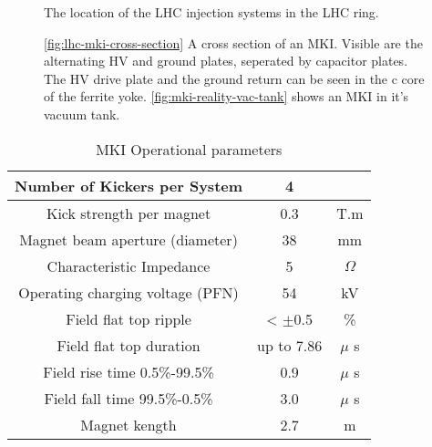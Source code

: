 \begin{figure}
\label{fig:lhc-injection-systems}
\caption{The location of the LHC injection systems in the LHC ring.}
\end{figure}


\begin{figure}
\subfigure[]{
\label{fig:lhc-mki-cross-section}
}
\subfigure[]{
\label{fig:mki-reality-vac-tank}
}
\caption{\ref{fig:lhc-mki-cross-section} A cross section of an MKI. Visible are the alternating HV and ground plates, seperated by capacitor plates. The HV drive plate and the ground return can be seen in the c core of the ferrite yoke. \ref{fig:mki-reality-vac-tank} shows an MKI in it's vacuum tank.}
\end{figure}

\begin{table}
\caption{MKI Operational parameters}

\begin{center}
\begin{tabular}{c | c | c}
Number of Kickers per System & 4 & \\ \hline
Kick strength per magnet & 0.3 & T.m \\ \hline
Magnet beam aperture (diameter) & 38 & mm \\ \hline
Characteristic Impedance & 5 & $\Omega$ \\ \hline
Operating charging voltage (PFN) & 54 & kV \\ \hline
Field flat top ripple & < $\pm$0.5 & \% \\ \hline
Field flat top duration & up to 7.86 & $\mu$ s \\ \hline
Field rise time 0.5\%-99.5\% & 0.9 & $\mu$ s \\ \hline
Field fall time 99.5\%-0.5\% & 3.0 & $\mu$ s \\ \hline
Magnet kength & 2.7 & m \\ 
\end{tabular}
\end{center}
\label{tab:mki-parameters}
\end{table}